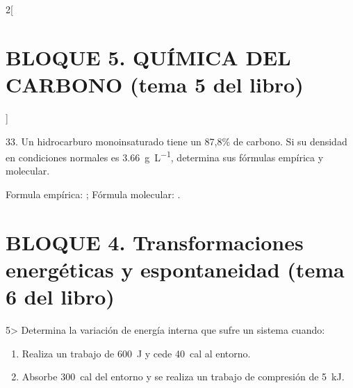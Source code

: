 \documentclass[10pt]{article}
\begin{document}
\begin{multicols}{2}[
  \section{BLOQUE 5. QUÍMICA DEL CARBONO (tema 5 del libro)}
  ]
\begin{exercise}
  33. Un hidrocarburo monoinsaturado tiene un 87,8\% de carbono.
  Si su densidad en condiciones normales es \SI{3,66}{\gram\per\liter}, determina sus fórmulas empírica y molecular.
\end{exercise}

\begin{solution}
  Formula empírica: ; Fórmula molecular: .
\end{solution}

\end{multicols}

\section{BLOQUE 4. Transformaciones energéticas y espontaneidad (tema 6 del libro)}

\begin{exercise}
  5> Determina la variación de energía interna que sufre un sistema
  cuando:
  \begin{enumerate}
    \item Realiza un trabajo de \SI{600}{\joule} y cede \SI{40}{cal} al entorno.
    \item Absorbe \SI{300}{cal} del entorno y se realiza un trabajo de compresión de \SI{5}{\kilo\joule}.
  \end{enumerate}
\end{exercise}
\end{document}
